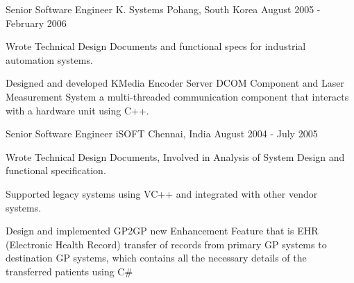 \begin{cventries}


\cventry
{Senior Software Engineer} %
{K. Systems} %
{Pohang, South Korea} %
{August 2005 - February 2006} %
{
	\begin{cvitems} %
		\item {Wrote Technical Design Documents and functional specs for industrial automation systems. }
		\item {Designed and developed KMedia Encoder Server DCOM Component and Laser Measurement System a multi-threaded communication component that interacts with a hardware unit using C++. }
	\end{cvitems}
}



\cventry
{Senior Software Engineer} %
{iSOFT} %
{Chennai, India} %
{August 2004 - July 2005} %
{
	\begin{cvitems} %
		\item {Wrote Technical Design Documents, Involved in Analysis of System Design and functional specification. }
		\item {Supported legacy systems using VC++ and integrated with other vendor systems.}
		\item {Design and implemented GP2GP new Enhancement Feature that is EHR (Electronic Health Record) transfer of records from primary GP systems to destination GP systems, which contains all the necessary details of the transferred patients using C\#}
	\end{cvitems}
}



\end{cventries}
